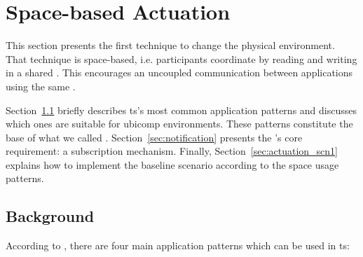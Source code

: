 \section{Space-based Actuation}
\label{sec:actuation_space}


This section presents the first technique to change the physical environment.
That technique is space-based, i.e. participants coordinate by reading and writing in a shared \Space{}. %
This encourages an uncoupled communication between applications using the same \Space{}.

Section~\ref{sec:ts_patterns} briefly describes \acl{ts}'s most common application patterns and discusses which ones are suitable for \ac{ubicomp} environments. %
These patterns constitute the base of what we called \spaceActuation{}.
Section~\ref{sec:notification} presents the \spaceActuation{}'s core requirement: a subscription mechanism.
Finally, Section~\ref{sec:actuation_scn1} explains how to implement the baseline scenario according to the space usage patterns. %


\subsection{Background}
\label{sec:ts_patterns}

According to \citet{freeman_javaspaces_1999}, there are four main application patterns which can be used in \ac{ts}:

